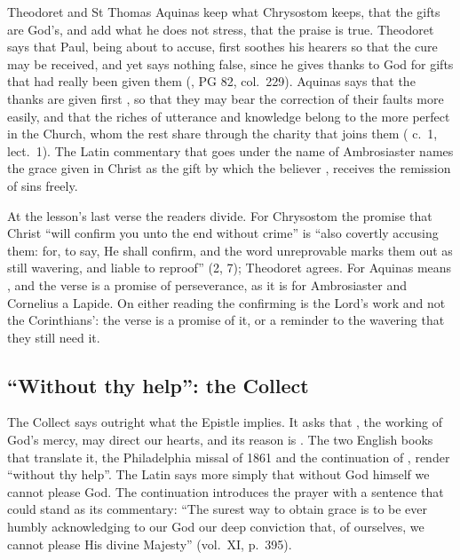 Theodoret and St Thomas Aquinas keep what Chrysostom keeps, that the gifts are
God's, and add what he does not stress, that the praise is true. Theodoret
says that Paul, being about to accuse, first soothes his hearers so that the
cure may be received, and yet says nothing false, since he gives thanks to God
for gifts that had really been given them (, PG 82, col.~229). Aquinas says that the thanks are given first
, so that they may
bear the correction of their faults more easily, and that the riches of
utterance and knowledge belong to the more perfect in the Church, whom the
rest share through the charity that joins them (
c.~1, lect.~1). The Latin commentary that goes under the name of Ambrosiaster
names the grace given in Christ as the gift by which the believer , receives the remission of sins freely.

At the lesson's last verse the readers divide. For Chrysostom the promise that
Christ ``will confirm you unto the end without crime'' is ``also covertly
accusing them: for, to say, He shall confirm, and the word unreprovable marks
them out as still wavering, and liable to reproof'' (2, 7); Theodoret agrees. For
Aquinas  means , and the verse is
a promise of perseverance, as it is for Ambrosiaster and Cornelius a Lapide. On
either reading the confirming is the Lord's work and not the Corinthians': the
verse is a promise of it, or a reminder to the wavering that they still need
it.

\subsection{``Without thy help'': the Collect}

The Collect says outright what the Epistle implies. It asks that , the working of God's mercy, may direct our hearts, and
its reason is . The two English
books that translate it, the Philadelphia missal of 1861 and the continuation
of , render  ``without thy help''. The
Latin says more simply that without God himself we cannot please God. The
continuation introduces the prayer with a sentence that could stand as its
commentary: ``The surest way to obtain grace is to be ever humbly acknowledging
to our God our deep conviction that, of ourselves, we cannot please His divine
Majesty'' (vol.~XI, p.~395).

